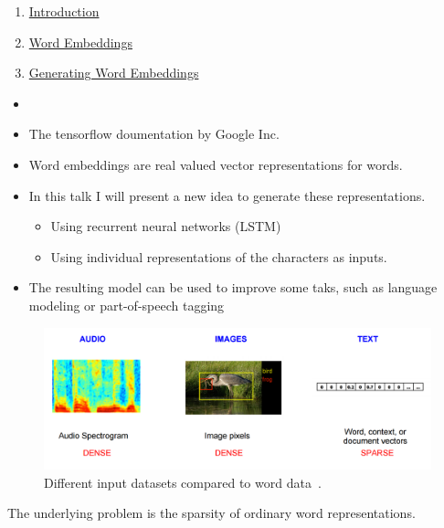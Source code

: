 \documentclass[11pt, a4paper, landscape]{article}
\begin{document}
\TitlePage

\NewPage{}
\small
\vfill
\begin{enumerate}
\item \hyperlink{sli:introduction}{Introduction}
\item \hyperlink{sli:word-embeddings}{Word Embeddings}
\item \hyperlink{sli:simple}{Generating Word Embeddings}
\end{enumerate}
\vfill
\normalsize
\vfill

\NewPage{} 
\vfill
\begin{itemize}
\item 
\item \cite{tensorflow:word2vec} The tensorflow doumentation by Google Inc.\
\end{itemize}
\vfill 


\NewPage\headline{Introduction} 
\hypertarget{sli:introduction}{}

\vfill
\begin{itemize}
\item Word embeddings are real valued vector representations for words.
\item In this talk I will present a new idea to generate these representations.
  \begin{itemize}
  \item Using recurrent neural networks (LSTM)
  \item Using individual representations of the characters as inputs.
\end{itemize}
\item The resulting model can be used to improve some taks, 
such as language modeling or part-of-speech tagging
\end{itemize}

\begin{figure}[H]
\begin{center}
  \includegraphics[width=.6\textwidth]{../article/img/audio-image-text}
  \caption{Different input datasets compared to word data~\cite{tensorflow:word2vec}.}
  \label{fig:audio-image-text}
\end{center}
\end{figure}
  The underlying problem is the sparsity of ordinary word representations.
\vfill
\end{document}
